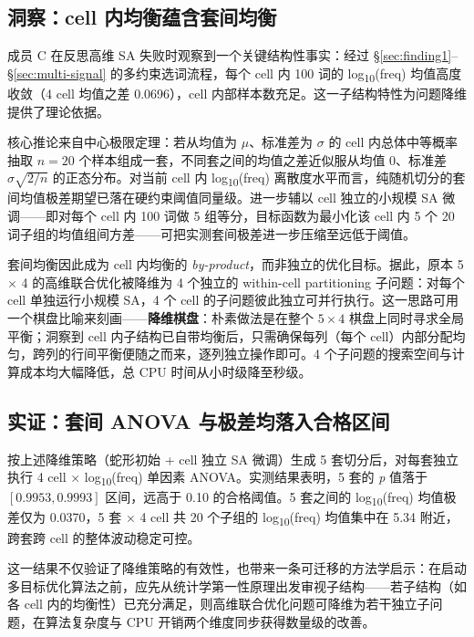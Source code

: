 \documentclass[12pt, a4paper]{article}
\begin{document}
\subsection{洞察：cell 内均衡蕴含套间均衡}

成员 C 在反思高维 SA 失败时观察到一个关键结构性事实：经过 \S\ref{sec:finding1}--\S\ref{sec:multi-signal} 的多约束选词流程，每个 cell 内 100 词的 log\textsubscript{10}(freq) 均值高度收敛（4 cell 均值之差 0.0696），cell 内部样本数充足。这一子结构特性为问题降维提供了理论依据。

核心推论来自中心极限定理：若从均值为 $\mu$、标准差为 $\sigma$ 的 cell 内总体中等概率抽取 $n = 20$ 个样本组成一套，不同套之间的均值之差近似服从均值 0、标准差 $\sigma\sqrt{2/n}$ 的正态分布。对当前 cell 内 log\textsubscript{10}(freq) 离散度水平而言，纯随机切分的套间均值极差期望已落在硬约束阈值同量级。进一步辅以 cell 独立的小规模 SA 微调——即对每个 cell 内 100 词做 5 组等分，目标函数为最小化该 cell 内 5 个 20 词子组的均值组间方差——可把实测套间极差进一步压缩至远低于阈值。

套间均衡因此成为 cell 内均衡的 \textit{by-product}，而非独立的优化目标。据此，原本 5 $\times$ 4 的高维联合优化被降维为 4 个独立的 within-cell partitioning 子问题：对每个 cell 单独运行小规模 SA，4 个 cell 的子问题彼此独立可并行执行。这一思路可用一个棋盘比喻来刻画——\textbf{降维棋盘}：朴素做法是在整个 $5 \times 4$ 棋盘上同时寻求全局平衡；洞察到 cell 内子结构已自带均衡后，只需确保每列（每个 cell）内部分配均匀，跨列的行间平衡便随之而来，逐列独立操作即可。4 个子问题的搜索空间与计算成本均大幅降低，总 CPU 时间从小时级降至秒级。

\subsection{实证：套间 ANOVA 与极差均落入合格区间}

按上述降维策略（蛇形初始 + cell 独立 SA 微调）生成 5 套切分后，对每套独立执行 4 cell $\times$ log\textsubscript{10}(freq) 单因素 ANOVA。实测结果表明，5 套的 \textit{p} 值落于 $[0.9953, 0.9993]$ 区间，远高于 0.10 的合格阈值。5 套之间的 log\textsubscript{10}(freq) 均值极差仅为 0.0370，5 套 $\times$ 4 cell 共 20 个子组的 log\textsubscript{10}(freq) 均值集中在 5.34 附近，跨套跨 cell 的整体波动稳定可控。

这一结果不仅验证了降维策略的有效性，也带来一条可迁移的方法学启示：在启动多目标优化算法之前，应先从统计学第一性原理出发审视子结构——若子结构（如各 cell 内的均衡性）已充分满足，则高维联合优化问题可降维为若干独立子问题，在算法复杂度与 CPU 开销两个维度同步获得数量级的改善。
\end{document}
